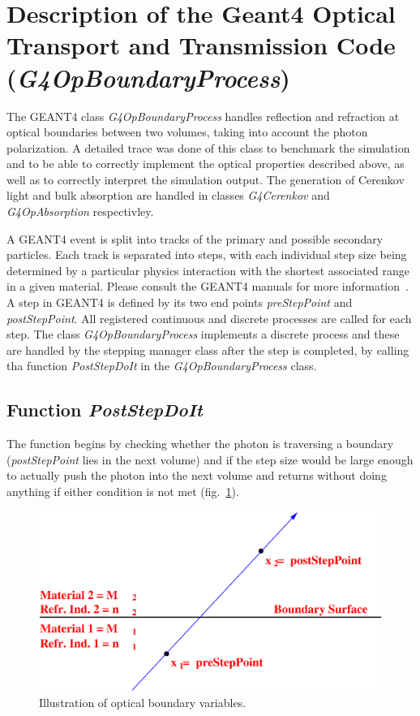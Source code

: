 \clearpage

\section{Description of the Geant4 Optical Transport and Transmission Code \\
         ({\it G4OpBoundaryProcess})}\label{G4OPTR}

The GEANT4 class {\it G4OpBoundaryProcess} handles reflection and
refraction at optical boundaries between two volumes, taking into
account the photon polarization. A detailed trace was done of this
class to benchmark the simulation and to be able to correctly
implement the optical properties described above, as well as to
correctly interpret the simulation output. The generation of Cerenkov
light and bulk absorption are handled in classes {\it G4Cerenkov} and
{\it G4OpAbsorption} respectivley. 

A GEANT4 event is split into tracks of the primary and possible
secondary particles. Each track is separated into steps, with each
individual step size being determined by a particular physics
interaction with the shortest associated range in a given
material. Please consult the GEANT4 manuals for more
information~\cite{tn:GEANT4SFM}.  A step in GEANT4 is defined by its
two end points {\em preStepPoint} and {\em postStepPoint}.  All registered
continuous and discrete processes are called for each step. The class
{\it G4OpBoundaryProcess} implements a discrete process and these are
handled by the stepping manager class after the step is completed, by
calling tha function {\it PostStepDoIt} in the {\it G4OpBoundaryProcess}
class.

\subsection{Function {\it PostStepDoIt}}
The function begins by checking whether the photon is traversing a
boundary ({\em postStepPoint} lies in the next volume) and if the step
size would be large enough to actually push the photon into the next
volume and returns without doing anything if either condition is not
met (fig.~\ref{fig:OPBOUND1}).

\begin{figure}[h]
  \hspace{3cm}
  \includegraphics[scale=0.4]{./figures5/OpBoundary01.eps}
  \caption{Illustration of optical boundary variables.}
           \label{fig:OPBOUND1}
\end{figure}

